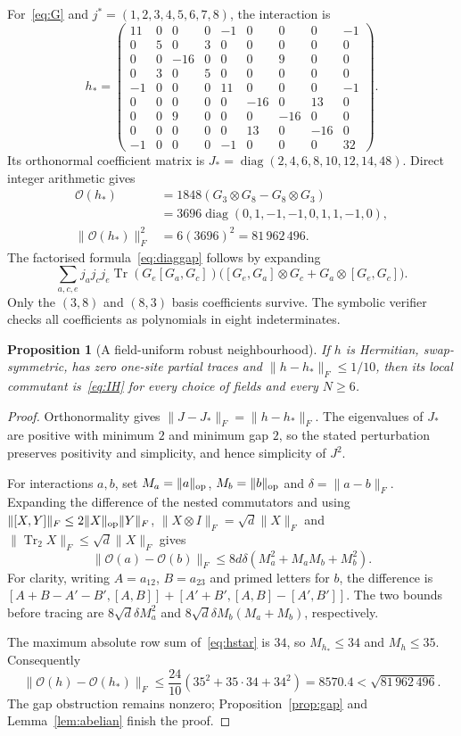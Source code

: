 \documentclass[11pt,a4paper]{article}
\numberwithin{equation}{section}
\newtheorem{proposition}[theorem]{Proposition}
\theoremstyle{definition}\newtheorem{definition}[theorem]{Definition}
\theoremstyle{remark}\newtheorem{remark}[theorem]{Remark}
\DeclareMathOperator{\Tr}{Tr}\DeclareMathOperator{\rank}{rank}
\DeclareMathOperator{\diag}{diag}\DeclareMathOperator{\Disc}{Disc}
\newcommand{\Ob}{\mathcal O}\newcommand{\tens}{\otimes}
\begin{document}
For~\eqref{eq:G} and $j^*=(1,2,3,4,5,6,7,8)$, the interaction is
\begin{equation}\label{eq:hstar}
 h_*=\begin{pmatrix}
11&0&0&0&-1&0&0&0&-1\\
0&5&0&3&0&0&0&0&0\\
0&0&-16&0&0&0&9&0&0\\
0&3&0&5&0&0&0&0&0\\
-1&0&0&0&11&0&0&0&-1\\
0&0&0&0&0&-16&0&13&0\\
0&0&9&0&0&0&-16&0&0\\
0&0&0&0&0&13&0&-16&0\\
-1&0&0&0&-1&0&0&0&32
\end{pmatrix}.
\end{equation}
Its orthonormal coefficient matrix is $J_* =\diag(2,4,6,8,10,12,14,48)$. Direct integer arithmetic gives
\begin{align*}
 \Ob(h_*)&=1848(G_3\tens G_8-G_8\tens G_3)\\
 &=3696\diag(0,1,-1,-1,0,1,1,-1,0),\\
 \|\Ob(h_*)\|_F^2&=6(3696)^2=81\,962\,496.
\end{align*}
The factorised formula~\eqref{eq:diaggap} follows by expanding
\[
 \sum_{a,c,e}j_aj_cj_e\Tr(G_e[G_a,G_c])
 \bigl([G_e,G_a]\tens G_c+G_a\tens[G_e,G_c]\bigr).
\]
Only the $(3,8)$ and $(8,3)$ basis coefficients survive. The symbolic verifier checks all coefficients as polynomials in eight indeterminates.

\begin{proposition}[A field-uniform robust neighbourhood]\label{prop:ball}
If $h$ is Hermitian, swap-symmetric, has zero one-site partial traces and $\|h-h_*\|_F\le1/10$, then its local commutant is~\eqref{eq:IH} for every choice of fields and every $N\ge6$.
\end{proposition}
\begin{proof}
Orthonormality gives $\|J-J_*\|_F=\|h-h_*\|_F$. The eigenvalues of $J_*$ are positive with minimum $2$ and minimum gap $2$, so the stated perturbation preserves positivity and simplicity, and hence simplicity of $J^2$.

For interactions $a,b$, set $M_a=\|a\|_{\mathrm{op}}$, $M_b=\|b\|_{\mathrm{op}}$ and $\delta=\|a-b\|_F$. Expanding the difference of the nested commutators and using
$\|[X,Y]\|_F\le2\|X\|_{\mathrm{op}}\|Y\|_F$,
$\|X\tens I\|_F=\sqrt d\|X\|_F$ and
$\|\Tr_2X\|_F\le\sqrt d\|X\|_F$ gives
\[
 \|\Ob(a)-\Ob(b)\|_F
 \le8d\delta(M_a^2+M_aM_b+M_b^2).
\]
For clarity, writing $A=a_{12}$, $B=a_{23}$ and primed letters for $b$, the difference is
$[A+B-A'-B',[A,B]]+[A'+B',[A,B]-[A',B']]$.
The two bounds before tracing are $8\sqrt d\delta M_a^2$ and $8\sqrt d\delta M_b(M_a+M_b)$, respectively.

The maximum absolute row sum of~\eqref{eq:hstar} is $34$, so $M_{h_*}\le34$ and $M_h\le35$. Consequently
\[
 \|\Ob(h)-\Ob(h_*)\|_F
 \le\frac{24}{10}(35^2+35\cdot34+34^2)=8570.4
 <\sqrt{81\,962\,496}.
\]
The gap obstruction remains nonzero; Proposition~\ref{prop:gap} and Lemma~\ref{lem:abelian} finish the proof.
\end{proof}
\end{document}
